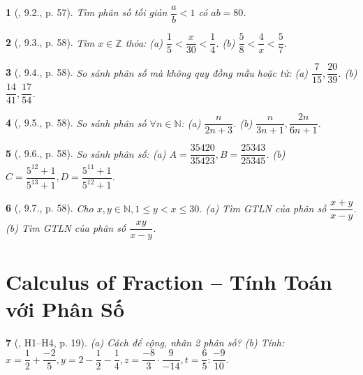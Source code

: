 \documentclass{article}
\newtheorem{baitoan}{}
\begin{document}
\begin{baitoan}[\cite{TLCT_THCS_Toan_6_so_hoc}, 9.2., p. 57]
	Tìm phân số tối giản $\dfrac{a}{b} < 1$ có $ab = 80$.
\end{baitoan}

\begin{baitoan}[\cite{TLCT_THCS_Toan_6_so_hoc}, 9.3., p. 58]
	Tìm $x\in\mathbb{Z}$ thỏa: (a) $\dfrac{1}{5} < \dfrac{x}{30} < \dfrac{1}{4}$. (b) $\dfrac{5}{8} < \dfrac{4}{x} < \dfrac{5}{7}$.
\end{baitoan}

\begin{baitoan}[\cite{TLCT_THCS_Toan_6_so_hoc}, 9.4., p. 58]
	So sánh phân số mà không quy đồng mẫu hoặc tử: (a) $\dfrac{7}{15},\dfrac{20}{39}$. (b) $\dfrac{14}{41},\dfrac{17}{54}$.
\end{baitoan}

\begin{baitoan}[\cite{TLCT_THCS_Toan_6_so_hoc}, 9.5., p. 58]
	So sánh phân số $\forall n\in\mathbb{N}$: (a) $\dfrac{n}{2n + 3}$. (b) $\dfrac{n}{3n + 1},\dfrac{2n}{6n + 1}$.
\end{baitoan}

\begin{baitoan}[\cite{TLCT_THCS_Toan_6_so_hoc}, 9.6., p. 58]
	So sánh phân số: (a) $A = \dfrac{35420}{35423},B = \dfrac{25343}{25345}$. (b) $C = \dfrac{5^{12} + 1}{5^{13} + 1},D = \dfrac{5^{11} + 1}{5^{12} + 1}$.
\end{baitoan}

\begin{baitoan}[\cite{TLCT_THCS_Toan_6_so_hoc}, 9.7., p. 58]
	Cho $x,y\in\mathbb{N},1\le y < x\le30$. (a) Tìm {\rm GTLN} của phân số $\dfrac{x + y}{x - y}$. (b) Tìm {\rm GTLN} của phân số $\dfrac{xy}{x - y}$.
\end{baitoan}


\section{Calculus of Fraction -- Tính Toán với Phân Số}

\begin{baitoan}[\cite{Binh_boi_duong_Toan_6_tap_2}, H1--H4, p. 19]
	(a) Cách để cộng, nhân 2 phân số? (b) Tính: $x = \dfrac{1}{2} + \dfrac{-2}{5},y = 2 - \dfrac{1}{2} - \dfrac{1}{4},z = \dfrac{-8}{3}\cdot\dfrac{9}{-14},t = \dfrac{6}{5}:\dfrac{-9}{10}$.
\end{baitoan}
\end{document}
